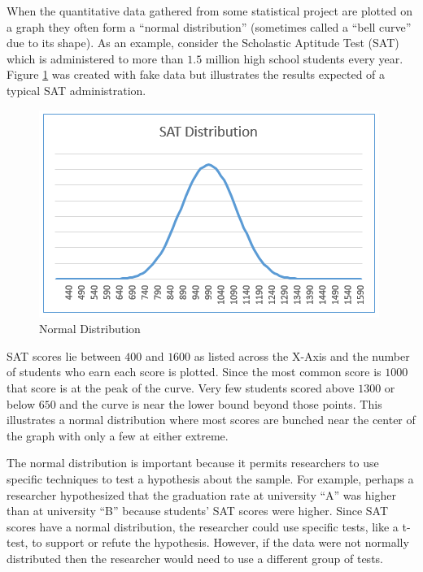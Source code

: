 When the quantitative data gathered from some statistical project are plotted on a graph they often form a ``normal distribution'' (sometimes called a ``bell curve'' due to its shape). As an example, consider the Scholastic Aptitude Test (SAT) which is administered to more than $ 1.5 $ million high school students every year. Figure \ref{fig05-01} was created with fake data but illustrates the results expected of a typical SAT administration.

\begin{figure}[H]
	\centering
	\includegraphics[width=\maxwidth{.95\linewidth}]{gfx/05-01}
	\caption{Normal Distribution}
	\label{fig05-01}
\end{figure}

SAT scores lie between $ 400 $ and $ 1600 $ as listed across the X-Axis and the number of students who earn each score is plotted. Since the most common score is $ 1000 $ that score is at the peak of the curve. Very few students scored above $ 1300 $ or below $ 650 $ and the curve is near the lower bound beyond those points. This illustrates a normal distribution where most scores are bunched near the center of the graph with only a few at either extreme.

The normal distribution is important because it permits researchers to use specific techniques to test a hypothesis about the sample. For example, perhaps a researcher hypothesized that the graduation rate at university ``A'' was higher than at university ``B'' because students' SAT scores were higher. Since SAT scores have a normal distribution, the researcher could use specific tests, like a t-test, to support or refute the hypothesis. However, if the data were not normally distributed then the researcher would need to use a different group of tests.

